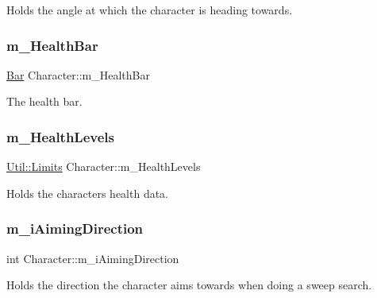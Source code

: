 Holds the angle at which the character is heading towards. 

\mbox{\label{class_character_ac04b03a0abdc6fe21f3326a98c788ecf}} 
\subsubsection{\texorpdfstring{m\+\_\+\+Health\+Bar}{m\_HealthBar}}
{\footnotesize\ttfamily \hyperlink{class_bar}{Bar} Character\+::m\+\_\+\+Health\+Bar\hspace{0.3cm}{\ttfamily [private]}}



The health bar. 

\mbox{\label{class_character_a944cd240090634db000d5f64ce6345fe}} 
\subsubsection{\texorpdfstring{m\+\_\+\+Health\+Levels}{m\_HealthLevels}}
{\footnotesize\ttfamily \hyperlink{struct_util_1_1_limits}{Util\+::\+Limits} Character\+::m\+\_\+\+Health\+Levels\hspace{0.3cm}{\ttfamily [private]}}



Holds the characters health data. 

\mbox{\label{class_character_a829ad896de47ffa2fd74c942feb0d9fa}} 
\subsubsection{\texorpdfstring{m\+\_\+i\+Aiming\+Direction}{m\_iAimingDirection}}
{\footnotesize\ttfamily int Character\+::m\+\_\+i\+Aiming\+Direction\hspace{0.3cm}{\ttfamily [private]}}



Holds the direction the character aims towards when doing a sweep search. 

